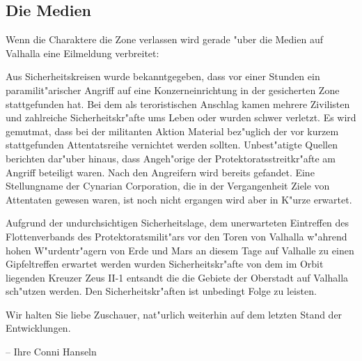 























\subsection{Die Medien} 
Wenn die Charaktere die Zone verlassen wird gerade "uber die Medien auf Valhalla eine Eilmeldung verbreitet:

\begin{speech}
Aus Sicherheitskreisen wurde bekanntgegeben, dass vor einer Stunden ein paramilit"arischer Angriff auf eine Konzerneinrichtung in der gesicherten Zone stattgefunden hat. Bei dem als teroristischen Anschlag kamen mehrere Zivilisten und zahlreiche Sicherheitskr"afte ums Leben oder wurden schwer verletzt. Es wird gemutma\3t, dass bei der militanten Aktion Material bez"uglich der vor kurzem stattgefunden Attentatsreihe vernichtet werden sollten. Unbest"atigte Quellen berichten dar"uber hinaus, dass Angeh"orige der Protektoratsstreitkr"afte am Angriff beteiligt waren. Nach den Angreifern wird bereits gefandet. Eine Stellungname der Cynarian Corporation, die in der Vergangenheit Ziele von Attentaten gewesen waren, ist noch nicht ergangen wird aber in K"urze erwartet.

Aufgrund der undurchsichtigen Sicherheitslage, dem unerwarteten Eintreffen des Flottenverbands des Protektoratsmilit"ars vor den Toren von Valhalla w"ahrend hohen W"urdentr"agern von Erde und Mars an diesem Tage auf Valhalle zu einen Gipfeltreffen erwartet werden wurden Sicherheitskr"afte von dem im Orbit liegenden Kreuzer Zeus II-1 entsandt die die Gebiete der Oberstadt auf Valhalla sch"utzen werden. Den Sicherheitskr"aften ist unbedingt Folge zu leisten.

Wir halten Sie liebe Zuschauer, nat"urlich weiterhin auf dem letzten Stand der Entwicklungen.

\nopagebreak
-- Ihre Conni Hanseln
\end{speech}

